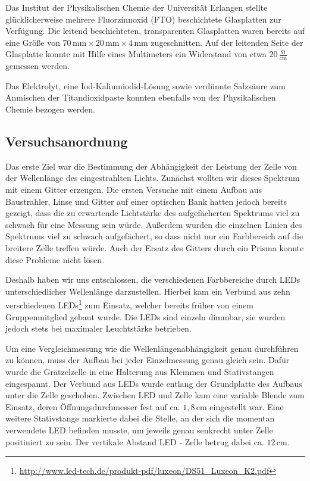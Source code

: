 \documentclass[11pt]{scrartcl}
\newcommand{\unit}[1]{\ensuremath{\,\mathrm{#1}}} %
\begin{document}
Das Institut der Physikalischen Chemie der Universit\"at Erlangen stellte gl\"ucklicherweise mehrere Fluorzinnoxid (FTO) beschichtete Glasplatten zur Verf\"ugung. Die leitend beschichteten, transparenten Glasplatten waren bereits auf eine Gr\"o\ss{}e von \(70\unit{mm} \times 20\unit{mm} \times 4 \unit{mm}\) zugeschnitten. Auf der leitenden Seite der Glasplatte konnte mit Hilfe eines Multimeters ein Widerstand von etwa \(20 \unit{\frac{\Omega}{cm}}\) gemessen werden.

Das Elektrolyt, eine Iod-Kaliumiodid-L\"osung sowie verd\"unnte Salzs\"aure zum Anmischen der Titandioxidpaste konnten ebenfalls von der Physikalischen Chemie bezogen werden.



\subsection{Versuchsanordnung} %
Das erste Ziel war die Bestimmung der Abh\"angigkeit der Leistung der Zelle von der Wellenl\"ange des eingestrahlten Lichts. Zun\"achst wollten wir dieses Spektrum mit einem Gitter erzeugen. Die ersten Versuche mit einem Aufbau aus Baustrahler, Linse und Gitter auf einer optischen Bank hatten jedoch bereits gezeigt, dass die zu erwartende Lichtst\"arke des aufgef\"acherten Spektrums viel zu schwach f\"ur eine Messung sein w\"urde. Außerdem wurden die einzelnen Linien des Spektrums viel zu schwach aufgef\"achert, so dass nicht nur ein Farbbereich auf die breitere Zelle treffen w\"urde. Auch der Ersatz des Gitters durch ein Prisma konnte diese Probleme nicht l\"osen.

Deshalb haben wir uns entschlossen, die verschiedenen Farbbereiche durch LEDs unterschiedlicher Wellenl\"ange darzustellen. Hierbei kam ein Verbund aus zehn verschiedenen LEDs\footnote{\url{http://www.led-tech.de/produkt-pdf/luxeon/DS51\_Luxeon\_K2.pdf}} zum Einsatz, welcher bereits fr\"uher von einem Gruppenmitglied gebaut wurde.
Die LEDs sind einzeln dimmbar, sie wurden jedoch stets bei maximaler Leuchtst\"arke betrieben.

Um eine Vergleichmessung wie die Wellenl\"angenabh\"angigkeit genau durchf\"uhren zu k\"onnen, muss der Aufbau bei jeder Einzelmessung genau gleich sein. Daf\"ur wurde die Gr\"atzelzelle in eine Halterung aus Klemmen und Stativstangen eingespannt. Der Verbund aus LEDs wurde entlang der Grundplatte des Aufbaus unter die Zelle geschoben. Zwischen LED und Zelle kam eine variable Blende zum Einsatz, deren \"Offnungsdurchmesser fest auf ca. $1,8\unit{cm}$ eingestellt war. Eine weitere Stativstange markierte dabei die Stelle, an der sich die momentan verwendete LED befinden musste, um jeweils genau senkrecht unter Zelle positiniert zu sein. Der vertikale Abstand LED - Zelle betrug dabei ca. $12\unit{cm}$.
\end{document}
